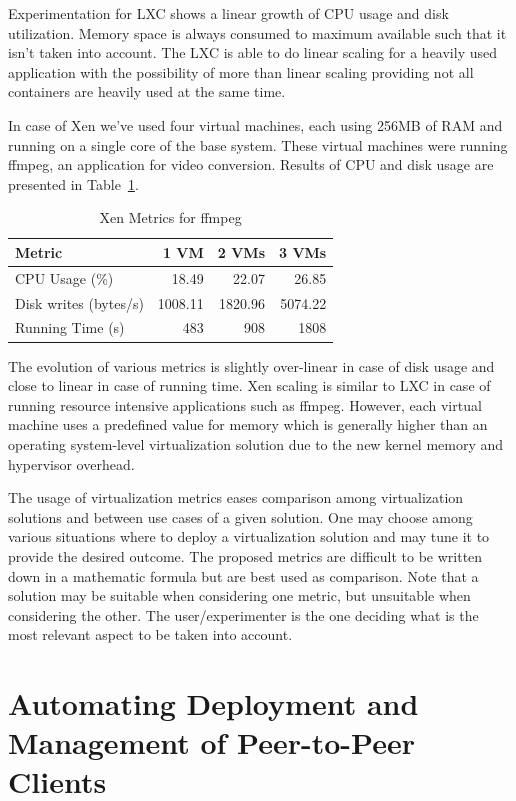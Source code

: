 Experimentation for LXC shows a linear growth of CPU usage and disk
utilization. Memory space is always consumed to maximum available such that it
isn't taken into account. The LXC is able to do linear scaling for a heavily
used application with the possibility of more than linear scaling providing
not all containers are heavily used at the same time.

In case of Xen we've used four virtual machines, each using 256MB of RAM and
running on a single core of the base system. These virtual machines were
running ffmpeg, an application for video conversion. Results of CPU and disk
usage are presented in Table~\ref{table:virt-infra:xen-metrics}.

\begin{table}[ht]
  \centering
  \begin{tabular}{@{}lrrr@{}}
    \toprule
    \textbf{Metric} & \textbf{1 VM} & \textbf{2 VMs} & \textbf{3 VMs} \\
    \midrule
    CPU Usage (\%) & 18.49 & 22.07 & 26.85 \\
    Disk writes (bytes/s) & 1008.11 & 1820.96 & 5074.22 \\
    Running Time (s) & 483 & 908 & 1808 \\
    \bottomrule
  \end{tabular}
  \caption{Xen Metrics for ffmpeg}
  \label{table:virt-infra:xen-metrics}
\end{table}

The evolution of various metrics is slightly over-linear in case of disk usage
and close to linear in case of running time. Xen scaling is similar to LXC in
case of running resource intensive applications such as ffmpeg. However, each
virtual machine uses a predefined value for memory which is generally higher
than an operating system-level virtualization solution due to the new kernel
memory and hypervisor overhead.

The usage of virtualization metrics eases comparison among virtualization
solutions and between use cases of a given solution. One may choose among
various situations where to deploy a virtualization solution and may tune it
to provide the desired outcome. The proposed metrics are difficult to be
written down in a mathematic formula but are best used as comparison. Note
that a solution may be suitable when considering one metric, but unsuitable
when considering the other. The user/experimenter is the one deciding what is
the most relevant aspect to be taken into account.

\section{Automating Deployment and Management of Peer-to-Peer Clients}
\label{sec:virt-infra:auto-deploy}

